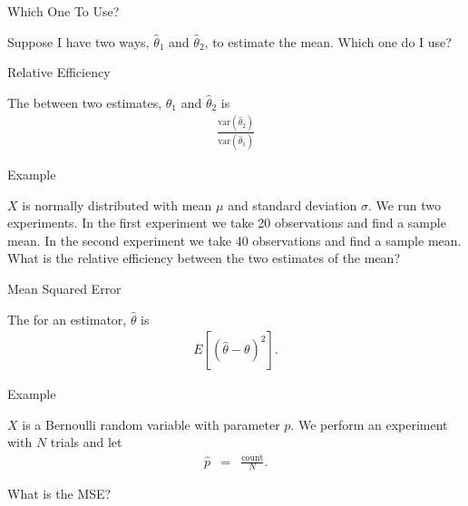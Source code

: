 \begin{frame}{Which One To Use?}

  Suppose I have two ways, $\hat{\theta}_1$ and $\hat{\theta}_2$, to
  estimate the mean. Which one do I use?
  
\end{frame}



\begin{frame}{Relative Efficiency}

  \begin{definition}
    The  between two 
    estimates, $\hat{\theta}_1$ and $\hat{\theta}_2$ is
    \begin{eqnarray*}
      \frac{\mathrm{var}\left( \hat{\theta}_2\right) }{\mathrm{var}\left( \hat{\theta}_1\right) }
    \end{eqnarray*}
  \end{definition}
  
\end{frame}


\begin{frame}{Example}

  $X$ is normally distributed with mean $\mu$ and standard deviation
  $\sigma$. We run two experiments. In the first experiment we take 20
  observations and find a sample mean. In the second experiment we
  take 40 observations and find a sample mean. What is the relative
  efficiency between the two estimates of the mean?
  
\end{frame}


\begin{frame}{Mean Squared Error}

  \begin{definition}
    The  for an estimator,
    $\hat{\theta}$ is
    \begin{eqnarray*}
      E\left[ \left( \hat{\theta} - \theta \right)^2\right].
    \end{eqnarray*}
  \end{definition}
  
\end{frame}


\begin{frame}{Example}

  $X$ is a Bernoulli random variable with parameter $p$. We perform an
  experiment with $N$ trials and let
  \begin{eqnarray*}
    \hat{p} & = & \frac{\mathrm{count}}{N}.
  \end{eqnarray*}

  What is the MSE?
  
\end{frame}

